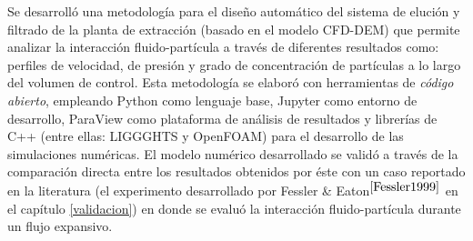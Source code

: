 \noindent
\justify

Se desarroll\'o una metodolog\'ia para el dise\~no autom\'atico del sistema de eluci\'on y filtrado de la planta de extracci\'on (basado en el modelo CFD-DEM) que permite analizar la interacci\'on fluido-part\'icula a trav\'es de diferentes resultados como: perfiles de velocidad, de presi\'on y grado de concentraci\'on de part\'iculas a lo largo del volumen de control. Esta metodolog\'ia se elabor\'o con herramientas de \textit{c\'odigo abierto}, empleando Python como lenguaje base, Jupyter como entorno de desarrollo, ParaView como plataforma de an\'alisis de resultados y librer\'ias de C++ (entre ellas: LIGGGHTS y OpenFOAM) para el desarrollo de las simulaciones num\'ericas. El modelo num\'erico desarrollado se valid\'o a trav\'es de la comparaci\'on directa entre los resultados obtenidos por \'este con un caso reportado en la literatura (el experimento desarrollado por Fessler \& Eaton$^{\cite{Fessler1999}}$ en el cap\'itulo \ref{validacion}) en donde se evalu\'o la interacci\'on fluido-part\'icula durante un flujo expansivo.
